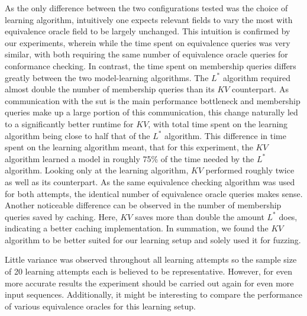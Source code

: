 As the only difference between the two configurations tested was the choice of learning algorithm, intuitively one expects relevant fields to vary the most with equivalence oracle field to be largely unchanged. This intuition is confirmed by our experiments, wherein while the time spent on equivalence queries was very similar, with both requiring the same number of equivalence oracle queries for conformance checking. In contrast, the time spent on membership queries differs greatly between the two model-learning algorithms. The $L^*$ algorithm required almost double the number of membership queries than its $KV$ counterpart. As communication with the \ac{sut} is the main performance bottleneck and membership queries make up a large portion of this communication, this change naturally led to a significantly better runtime for $KV$, with total time spent on the learning algorithm being close to half that of the $L^*$ algorithm. This difference in time spent on the learning algorithm meant, that for this experiment, the $KV$ algorithm learned a model in roughly 75\% of the time needed by the $L^*$ algorithm. Looking only at the learning algorithm, $KV$ performed roughly twice as well as its counterpart. As the same equivalence checking algorithm was used for both attempts, the identical number of equivalence oracle queries makes sense. Another noticeable difference can be observed in the number of membership queries saved by caching. Here, $KV$ saves more than double the amount $L^*$ does, indicating a better caching implementation. In summation, we found the $KV$ algorithm to be better suited for our learning setup and solely used it for fuzzing. 

Little variance was observed throughout all learning attempts so the sample size of 20 learning attempts each is believed to be representative. However, for even more accurate results the experiment should be carried out again for even more input sequences. Additionally, it might be interesting to compare the performance of various equivalence oracles for this learning setup.

